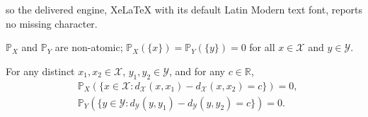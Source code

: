 \documentclass[10pt,a4paper]{amsart}
\begin{document}
so the delivered engine, XeLaTeX with its default Latin Modern text font, reports no missing character.
\begin{assumption}[No atoms]
	\label{ass:non-atomic}
	$\mathbb{P}_X$ and $\mathbb{P}_Y$ are non-atomic; $\mathbb{P}_X(\{x\}) = \mathbb{P}_Y(\{y\}) = 0$ for all $x \in \mathcal{X}$ and $y \in \mathcal{Y}$.
\end{assumption}

\begin{assumption}[No ties]
	\label{ass:no-tie}
	For any distinct $x_1,x_2 \in \mathcal{X}$, $y_1,y_2 \in \mathcal{Y}$, and for any $c \in \mathbb{R}$,
	\begin{align*}
		&\mathbb{P}_X(\{x \in \mathcal{X}: d_{\mathcal{X}}(x,x_1) - d_{\mathcal{X}}(x,x_2) = c\}) = 0 ,\\
		&\mathbb{P}_Y(\{y \in \mathcal{Y}: d_{\mathcal{Y}}(y,y_1) - d_{\mathcal{Y}}(y,y_2) = c\}) = 0 .
	\end{align*}
\end{assumption}
\end{document}
